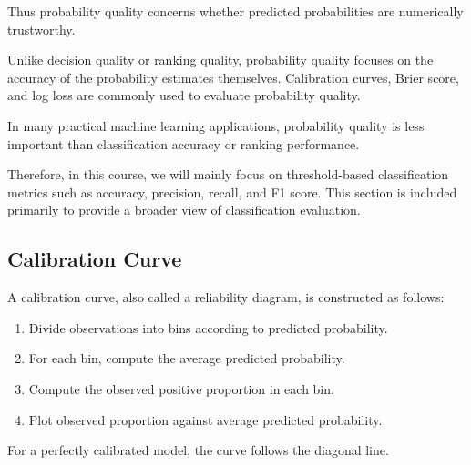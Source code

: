 \documentclass[
  letterpaper,
  DIV=11,
  numbers=noendperiod]{scrreprt}
\providecommand{\tightlist}{%
  \setlength{\itemsep}{0pt}\setlength{\parskip}{0pt}}
\theoremstyle{definition}
\theoremstyle{definition}
\theoremstyle{plain}
\theoremstyle{plain}
\theoremstyle{remark}
\begin{document}
Thus probability quality concerns whether predicted probabilities are
numerically trustworthy.

Unlike decision quality or ranking quality, probability quality focuses
on the accuracy of the probability estimates themselves. Calibration
curves, Brier score, and log loss are commonly used to evaluate
probability quality.

\begin{tcolorbox}[enhanced jigsaw, arc=.35mm, bottomrule=.15mm, bottomtitle=1mm, breakable, colback=white, colbacktitle=quarto-callout-note-color!10!white, colframe=quarto-callout-note-color-frame, coltitle=black, left=2mm, leftrule=.75mm, opacityback=0, opacitybacktitle=0.6, rightrule=.15mm, title=\textcolor{quarto-callout-note-color}{\faInfo}\hspace{0.5em}{Note}, titlerule=0mm, toprule=.15mm, toptitle=1mm]

In many practical machine learning applications, probability quality is
less important than classification accuracy or ranking performance.

Therefore, in this course, we will mainly focus on threshold-based
classification metrics such as accuracy, precision, recall, and F1
score. This section is included primarily to provide a broader view of
classification evaluation.

\end{tcolorbox}

\subsection{Calibration Curve}\label{calibration-curve}

A calibration curve, also called a reliability diagram, is constructed
as follows:

\begin{enumerate}
\def\labelenumi{\arabic{enumi}.}
\tightlist
\item
  Divide observations into bins according to predicted probability.
\item
  For each bin, compute the average predicted probability.
\item
  Compute the observed positive proportion in each bin.
\item
  Plot observed proportion against average predicted probability.
\end{enumerate}

For a perfectly calibrated model, the curve follows the diagonal line.
\end{document}
